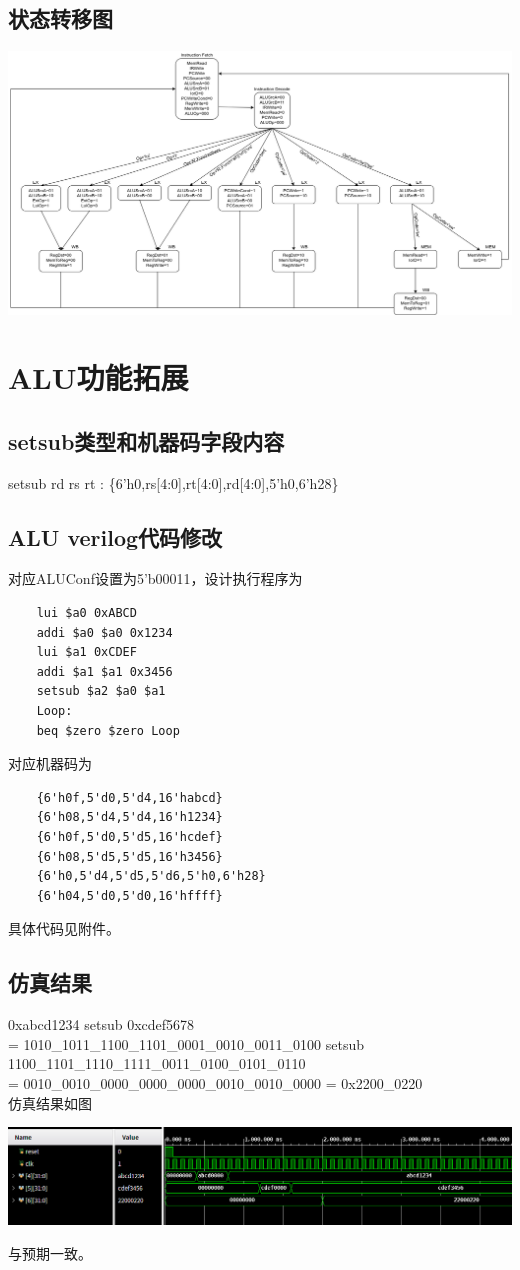 \documentclass{article}
\begin{document}
\subsection{状态转移图}
\begin{center}
    \includegraphics[width = 18cm]{images/fsm.png}
\end{center}


\section{ALU功能拓展}
\subsection{setsub类型和机器码字段内容}
setsub rd rs rt : \{6'h0,rs[4:0],rt[4:0],rd[4:0],5'h0,6'h28\}
\subsection{ALU verilog代码修改}
对应ALUConf设置为5'b00011，设计执行程序为
\begin{lstlisting}
    lui $a0 0xABCD      
    addi $a0 $a0 0x1234  
    lui $a1 0xCDEF
    addi $a1 $a1 0x3456  
    setsub $a2 $a0 $a1
    Loop:
    beq $zero $zero Loop
\end{lstlisting}
对应机器码为
\begin{lstlisting}
    {6'h0f,5'd0,5'd4,16'habcd}
    {6'h08,5'd4,5'd4,16'h1234}
    {6'h0f,5'd0,5'd5,16'hcdef}
    {6'h08,5'd5,5'd5,16'h3456}
    {6'h0,5'd4,5'd5,5'd6,5'h0,6'h28}
    {6'h04,5'd0,5'd0,16'hffff}
\end{lstlisting}
具体代码见附件。
\subsection{仿真结果}
0xabcd1234 setsub 0xcdef5678  \\
= 1010\_1011\_1100\_1101\_0001\_0010\_0011\_0100 setsub 1100\_1101\_1110\_1111\_0011\_0100\_0101\_0110\\
= 0010\_0010\_0000\_0000\_0000\_0010\_0010\_0000 = 0x2200\_0220\\
仿真结果如图
\begin{center}
    \includegraphics[width = 16cm]{images/sim_setsub_waveform.png}
\end{center}
与预期一致。
\end{document}
